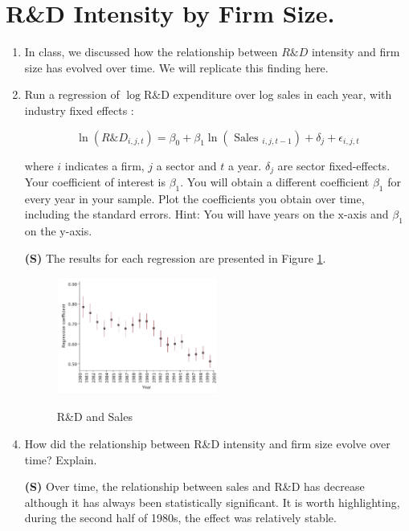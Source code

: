 \documentclass[12pt]{article}
\begin{document}
\FloatBarrier
\section{R\&D Intensity by Firm Size.}

\begin{enumerate}[leftmargin=0pt, label=\textbf{(\alph*)}]

\item In class, we discussed how the relationship between $R \& D$ intensity and firm size has evolved over time. We will replicate this finding here.

\item Run a regression of $\log \mathrm{R} \& \mathrm{D}$ expenditure over log sales in each year, with industry fixed effects :

\begin{equation*}
\ln \left(R \& D_{i, j, t}\right)=\beta_{0}+\beta_{1} \ln \left(\text { Sales }_{i, j, t-1}\right)+\delta_{j}+\epsilon_{i, j, t}
\end{equation*}

where $i$ indicates a firm, $j$ a sector and $t$ a year. $\delta_{j}$ are sector fixed-effects. Your coefficient of interest is $\beta_{1}$. You will obtain a different coefficient $\beta_{1}$ for every year in your sample. Plot the coefficients you obtain over time, including the standard errors. Hint: You will have years on the $\mathrm{x}$-axis and $\beta_{1}$ on the $\mathrm{y}$-axis.
\item[\textbf{(S)}] The results for each regression are presented in Figure \ref{fig:rd_time}. 

\begin{figure}[htb]
         \centering
         \caption{R\&D and Sales}
         \includegraphics[width=0.5\textwidth]{Figures/Figure5b.pdf}
         \label{fig:rd_time}
\end{figure}

\item How did the relationship between R\&D intensity and firm size evolve over time? Explain.
\item[\textbf{(S)}] Over time, the relationship between sales and R\&D has decrease although it has always been statistically significant. It is worth highlighting, during the second half of 1980s, the effect was relatively stable. 
\end{enumerate}
\end{document}
